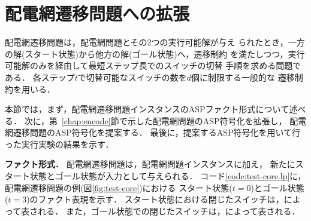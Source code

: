 \chapter{配電網遷移問題への拡張}\label{chap:core}





配電網遷移問題は，配電網問題とその2つの実行可能解が与え
られたとき，一方の解(スタート状態)から他方の解(ゴール状態)へ，遷移制約
を満たしつつ，実行可能解のみを経由して最短ステップ長でのスイッチの切替
手順を求める問題である．
各ステップ$t$で切替可能なスイッチの数を$d$個に制限する一般的な
遷移制約を用いる．

本節では，まず，配電網遷移問題インスタンスのASPファクト形式について述べる．
次に，第~\ref{chap:encode}節で示した配電網問題のASP符号化を拡張し，
配電網遷移問題のASP符号化を提案する．
最後に，提案するASP符号化を用いて行った実行実験の結果を示す．

\textbf{ファクト形式．}
配電網遷移問題は，配電網問題インスタンスに加え，
新たにスタート状態とゴール状態が入力として与えられる．
コード\ref{code:test-core.lp}に，
配電網遷移問題の例(図\ref{fig:test-core})における
スタート状態($t=0$)とゴール状態($t=3$)のファクト表現を示す．
スタート状態における閉じたスイッチは，によって表される．
また，ゴール状態での閉じたスイッチは，によって表される．

